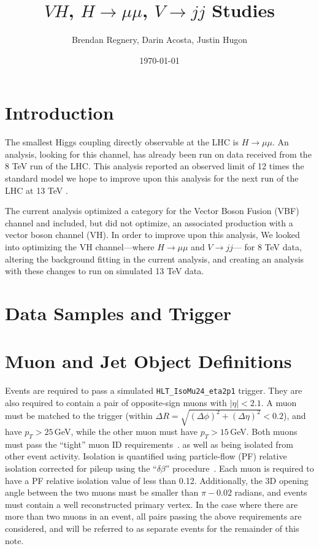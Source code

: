 \documentclass[12pt]{article}
\title{$VH$, $H\rightarrow \mu \mu$, $V\rightarrow jj$ Studies}
\author{Brendan Regnery, Darin Acosta, Justin Hugon}
\date{\today}
\begin{document}
\maketitle
 
\section{Introduction}

The smallest Higgs coupling directly observable at the LHC is $H\rightarrow \mu \mu$. 
An analysis, looking for this channel, has already been run on data received from the 8 TeV run of the LHC. 
This analysis reported an observed limit of 12 times the standard model \cite{hmmPap} 
we hope to improve upon this analysis for the next run of the LHC at 13 TeV \cite{hmmAN}. 

The current analysis optimized a category for the Vector Boson Fusion (VBF) channel and included, 
but did not optimize, an associated production with a vector boson channel (VH). 
In order to improve upon this analysis, We looked into optimizing the VH channel---where $H\rightarrow \mu \mu$ and $V\rightarrow jj$--- for 8 TeV data, 
altering the background fitting in the current analysis, and creating an analysis with these changes to run on simulated 13 TeV data.

\section{Data Samples and Trigger}

\section{Muon and Jet Object Definitions}

Events are required to pass a simulated \texttt{HLT\_IsoMu24\_eta2p1} trigger.
They are also required to contain a pair of opposite-sign muons with $|\eta|<2.1$.
A muon must be matched to the trigger (within $\Delta R = \sqrt{(\Delta \phi)^2+(\Delta \eta)^2}< 0.2$), 
and have $p_T>25$\,GeV, while the other muon must have $p_T>15$\,GeV.
Both muons must pass the ``tight'' muon ID requirements~\cite{AN2012_459}.
as well as being isolated from other event activity.  Isolation is quantified using
particle-flow (PF) relative isolation corrected for pileup using the ``$\delta \beta$''
procedure~\cite{AN2012_459}.  Each muon is required to have a PF relative isolation value
of less than 0.12.  Additionally, the 3D opening angle between the two muons must be
smaller than $\pi-0.02$ radians, and events must contain a well reconstructed primary
vertex.
In the case where there are more than two muons in an event, all pairs passing the above
requirements are considered, and will be referred to as separate events for the remainder
of this note.  
\end{document}
